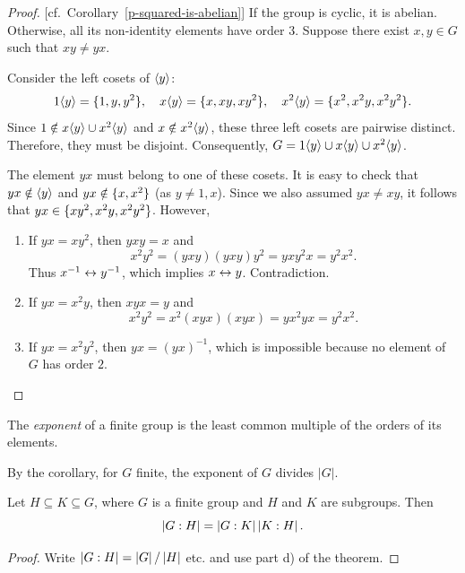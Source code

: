 \begin{proof}{[cf.~Corollary~\ref{p-squared-is-abelian}]} 
    If the group is cyclic, it is abelian. Otherwise, all its non-identity elements have order $3$. Suppose there exist $x,y\in G$ such that $xy\ne yx$.

    Consider the left cosets of $\langle y\rangle$:
    $$
        1\langle y\rangle=\{1,y,y^2\},\quad
        x\langle y\rangle=\{x,xy,xy^2\},\quad
        x^2\langle y\rangle=\{x^2,x^2y,x^2y^2\}.
    $$
    Since $1\notin x\langle y\rangle\cup x^2\langle y\rangle$ and $x\notin x^2\langle y\rangle$, these three left cosets are pairwise distinct. Therefore, they must be disjoint. Consequently, $G=1\langle y\rangle\cup x\langle y\rangle\cup x^2\langle y\rangle$.

    The element $yx$ must belong to one of these cosets. It is easy to check that $yx \notin \langle y\rangle$ and $yx \notin \{x, x^2\}$ (as $y \neq 1, x$). Since we also assumed $yx \ne xy$, it follows that $yx\in\{xy^2,x^2y,x^2y^2\}$. However,
    \begin{enumerate}[$\to$]
        \item If $yx=xy^2$, then $yxy=x$ and
        $$
            x^2y^2 = (yxy)(yxy)y^2 = yxy^2x = y^2x^2.
        $$
        Thus $x^{-1}\mathrel\leftrightarrow y^{-1}$, which implies $x\mathrel\leftrightarrow y$. Contradiction.
        
        \item If $yx=x^2y$, then $xyx=y$ and
        $$
            x^2y^2=x^2(xyx)(xyx)=yx^2yx=y^2x^2.
        $$
        
        \item If $yx=x^2y^2$, then $yx=(yx)^{-1}$, which is impossible because no element of $G$ has order $2$.
    \end{enumerate}
\end{proof}


\begin{defn}
    The \textsl{exponent} of a finite group is the least common multiple of the orders of its elements.
\end{defn}

\begin{rem}
     By the corollary, for\/ $G$ finite, the exponent of\/ $G$ divides $|G|$.
\end{rem}

\begin{cor}\label{group-index-product}
    Let $H \subseteq K \subseteq G$, where $G$ is a finite group and\/ $H$ and\/ $K$ are subgroups. Then 
    $$
        \left\vert{G:H}\right\vert = \left\vert{G:K}\right\vert\left\vert{K:H}\right\vert.
    $$
\end{cor}
\begin{proof} Write $\left\vert{G:H}\right\vert=\left\vert{G}\right\vert/\left\vert{H}\right\vert$ etc. and use part d) of the theorem.  \end{proof}

